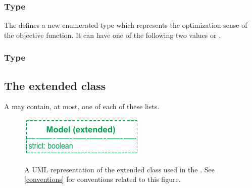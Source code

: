 \subsubsection{Type }
\label{primtype-fbctype}

The \FBCPackage defines a new enumerated type  which represents the optimization sense of the objective function. It can have one of the following two values  or .

\subsubsection{Type }
\label{primtype-fbcvariabletype}



\subsection{The extended  class}
\label{model-class}

 A \Model may contain, at most, one of each of these lists.

\begin{figure}[ht]
  \centering
  \includegraphics[width=6cm]{images/v3harmony_fbc_model.pdf}\\
  \caption{A UML representation of the extended \SBML \Model class used in
  the \FBCPackage. See \ref{conventions} for conventions related to this
  figure.}
  \label{fig:fbc_uml_model}
\end{figure}


%

